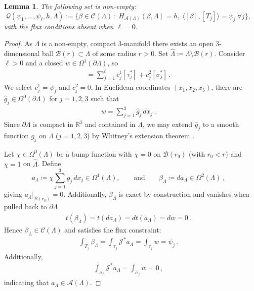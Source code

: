 \documentclass[11pt]{article}
\theoremstyle{plain}
\newtheorem{lemma}[theorem]{Lemma}
\theoremstyle{definition}
\theoremstyle{remark}
\newcommand{\R}{\mathbb{R}}
\newcommand{\B}{\mathcal{B}}
\newcommand{\ST}{\Lambda}
\begin{document}
\begin{lemma}\label{lemma:c1}
    The following set is non-empty:
    \[
    \mathscr Q(\psi_1,\dots,\psi_\ell,h,\ST)
    :=\Big\{\beta \in\mathcal C(\ST)\ :\ H_{\mathscr{A}(\ST)}(\beta,\ST)=h,\ \langle[ \beta ],[T_j]\rangle=\psi_j\ \forall j\Big\},
    \]
    with the flux conditions absent when \(\ell=0\). 
\end{lemma}
\begin{proof}
As $\ST$ is a non-empty, compact 3-manifold there exists an open 3-dimensional ball $\B(r) \subset\ST$ of some radius $r>0$. Set \(\widehat{\ST}\coloneqq \ST\setminus \B(r)\). Consider \(\ell>0\) and a closed \(w \in \Omega^1(\partial \ST)\), so
\begin{align*}
    [w] = \sum_{j=1}^\ell c^1_j [\tau_j^*] + c^2_j [\sigma_j^*] \, .
\end{align*}
We select \(c^1_j = \psi_j\) and \(c^2_j = 0\). In Euclidean coordinates \((x_1, x_2, x_3)\), there are \(\widehat g_j \in \Omega^0(\partial \ST)\) for \(j=1,2,3\) such that
\begin{align*}
    w = \sum_{j=1}^3 \widehat g_{j}\,dx_j \, .
\end{align*}
Since $\partial {\ST}$ is compact in \(\R^3\) and contained in $\ST$, we may extend $\widehat g_j$ to a smooth function \(g_j\) on $\ST$ (\(j=1,2,3\)) by Whitney's extension theorem \cite{whitney1992analytic}. 

Let \(\chi\in \Omega^0 (\ST)\) be a bump function with \(\chi=0\) on \(\B(r_0)\) (with \(r_0 < r\)) and \(\chi=1\) on \(\widehat{\ST}\). Define
\[
a_{\ST}\coloneqq \chi \sum_{j=1}^3 g_{j}\,dx_j   \in\Omega^1(\ST),\qquad \text{and} \qquad \beta_{\ST}\coloneqq d a_{\ST} \in\Omega^2(\ST) \, ,
\]
giving \(a_{\ST}|_{\B(r_0)}= 0\). Additionally, \(\beta _{\ST}\) is exact by construction and vanishes when pulled back to \(\partial\ST\)
\begin{align*}
    t(\beta _{\ST}) = t(d a_{\ST}) = d t(a_{\ST}) = d w = 0 \, .
\end{align*}
Hence \(\beta _{\ST} \in \mathcal{C}(\ST)\) and satisfies the flux constraint:
\begin{align*}
    \int_{T_j} \beta _{\ST} = \int_{\tau_j} \mathcal{J}^* a_{\ST} = \int_{\tau_j} w = \psi_j \, .
\end{align*}
Additionally, 
\begin{align*}
    \int_{\sigma_j} \mathcal{J}^* a_{\ST} = \int_{\sigma_j} w = 0 \, ,
\end{align*}
indicating that \(a_{\ST} \in \mathscr{A}(\ST)\). 




\end{proof}
\end{document}
